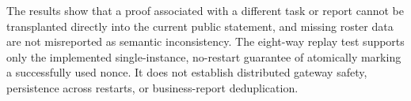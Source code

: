 The results show that a proof associated with a different task or report cannot be transplanted directly into the current public statement, and missing roster data are not misreported as semantic inconsistency. The eight-way replay test supports only the implemented single-instance, no-restart guarantee of atomically marking a successfully used nonce. It does not establish distributed gateway safety, persistence across restarts, or business-report deduplication.
